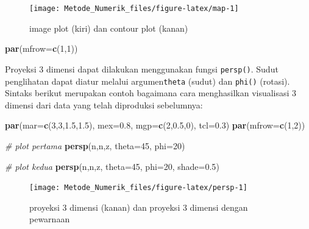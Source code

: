 \documentclass[]{book}
\newenvironment{Shaded}{\begin{snugshade}}{\end{snugshade}}
\newcommand{\CommentTok}[1]{\textcolor[rgb]{0.56,0.35,0.01}{\textit{#1}}}
\newcommand{\DataTypeTok}[1]{\textcolor[rgb]{0.13,0.29,0.53}{#1}}
\newcommand{\DecValTok}[1]{\textcolor[rgb]{0.00,0.00,0.81}{#1}}
\newcommand{\FloatTok}[1]{\textcolor[rgb]{0.00,0.00,0.81}{#1}}
\newcommand{\KeywordTok}[1]{\textcolor[rgb]{0.13,0.29,0.53}{\textbf{#1}}}
\newcommand{\NormalTok}[1]{#1}
\theoremstyle{definition}
\theoremstyle{definition}
\theoremstyle{definition}
\theoremstyle{remark}
\begin{document}
\begin{figure}

{\centering \texttt{[image: Metode\_Numerik\_files/figure-latex/map-1]} 

}

\caption{image plot (kiri) dan contour plot (kanan)}\label{fig:map}
\end{figure}

\begin{Shaded}
\begin{Highlighting}[]
\KeywordTok{par}\NormalTok{(}\DataTypeTok{mfrow=}\KeywordTok{c}\NormalTok{(}\DecValTok{1}\NormalTok{,}\DecValTok{1}\NormalTok{))}
\end{Highlighting}
\end{Shaded}

Proyeksi 3 dimensi dapat dilakukan menggunakan fungsi \texttt{persp()}. Sudut penglihatan dapat diatur melalui argumen\texttt{theta} (sudut) dan \texttt{phi()} (rotasi). Sintaks berikut merupakan contoh bagaimana cara menghasilkan visualisasi 3 dimensi dari data yang telah diproduksi sebelumnya:

\begin{Shaded}
\begin{Highlighting}[]
\KeywordTok{par}\NormalTok{(}\DataTypeTok{mar=}\KeywordTok{c}\NormalTok{(}\DecValTok{3}\NormalTok{,}\DecValTok{3}\NormalTok{,}\FloatTok{1.5}\NormalTok{,}\FloatTok{1.5}\NormalTok{), }\DataTypeTok{mex=}\FloatTok{0.8}\NormalTok{, }\DataTypeTok{mgp=}\KeywordTok{c}\NormalTok{(}\DecValTok{2}\NormalTok{,}\FloatTok{0.5}\NormalTok{,}\DecValTok{0}\NormalTok{), }\DataTypeTok{tcl=}\FloatTok{0.3}\NormalTok{)}
\KeywordTok{par}\NormalTok{(}\DataTypeTok{mfrow=}\KeywordTok{c}\NormalTok{(}\DecValTok{1}\NormalTok{,}\DecValTok{2}\NormalTok{))}

\CommentTok{# plot pertama}
\KeywordTok{persp}\NormalTok{(n,n,z, }\DataTypeTok{theta=}\DecValTok{45}\NormalTok{, }\DataTypeTok{phi=}\DecValTok{20}\NormalTok{)}

\CommentTok{# plot kedua}
\KeywordTok{persp}\NormalTok{(n,n,z, }\DataTypeTok{theta=}\DecValTok{45}\NormalTok{, }\DataTypeTok{phi=}\DecValTok{20}\NormalTok{, }\DataTypeTok{shade=}\FloatTok{0.5}\NormalTok{)}
\end{Highlighting}
\end{Shaded}

\begin{figure}

{\centering \texttt{[image: Metode\_Numerik\_files/figure-latex/persp-1]} 

}

\caption{proyeksi 3 dimensi (kanan) dan proyeksi 3 dimensi dengan pewarnaan}\label{fig:persp}
\end{figure}
\end{document}
